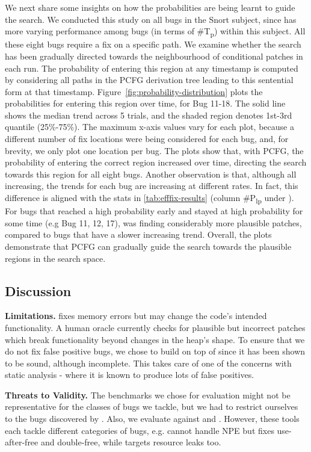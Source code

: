 

We next share some insights on how the probabilities are being learnt to guide the search. We conducted this study on all bugs in the Snort subject, since \tool has more varying performance among bugs (in terms of \#T\textsubscript{p}) within this subject.
All these eight bugs require a fix on a specific path.
We examine whether the search has been gradually directed towards the neighbourhood of conditional patches in each \tool run.
The probability of entering this region at any timestamp is computed by considering all paths in the PCFG derivation tree leading to this sentential form at that timestamp.
Figure~\ref{fig:probability-distribution} plots the probabilities for entering this region over time, for Bug 11-18.
The solid line shows the median trend across 5 trials, and the shaded region denotes 1st-3rd quantile (25\%-75\%).
The maximum x-axis values vary for each plot, because a different number of fix locations were being considered for each bug, and, for brevity, we only plot one location per bug.
The plots show that, with PCFG, the probability of entering the correct region increased over time, directing the search towards this region for all eight bugs.
Another observation is that, although all increasing, the trends for each bug are increasing at different rates.
In fact, this difference is aligned with the stats in \autoref{tab:efffix-results} (column \#P\textsubscript{lp} under \tool). 
For bugs that reached a high probability early and stayed at high probability for some time (e.g Bug 11, 12, 17), \tool was finding considerably more plausible patches, compared to bugs that have a slower increasing trend.
Overall, the plots demonstrate that PCFG can gradually guide the search towards the plausible regions in the search space.



\subsection{Discussion}
\textbf{Limitations.} \tool fixes memory errors but may change the code's intended functionality.
A human oracle currently checks for plausible but incorrect patches which break functionality beyond changes in the heap's shape. 
To ensure that we do not fix false positive bugs, we chose to build on top of \pulse since it has been shown to be sound, although incomplete. This takes care of one of the concerns with static analysis - where it is known to produce lots of false positives.


\textbf{Threats to Validity.} The benchmarks we chose for evaluation might not be representative for the classes of bugs we tackle, but we had to restrict ourselves to the bugs discovered by \pulse. Also, we evaluate \tool against \saver and \footpatch.
However, these tools each tackle different categories of bugs, e.g. \saver cannot handle NPE but fixes use-after-free and double-free, while \footpatch targets resource leaks too. 
